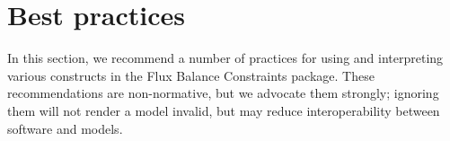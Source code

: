 
\section{Best practices}
\label{best-practices}

In this section, we recommend a number of practices for using and
interpreting various constructs in the Flux Balance Constraints package.
These recommendations are non-normative, but we advocate them strongly;
ignoring them will not render a model invalid, but may reduce
interoperability between software and models.
